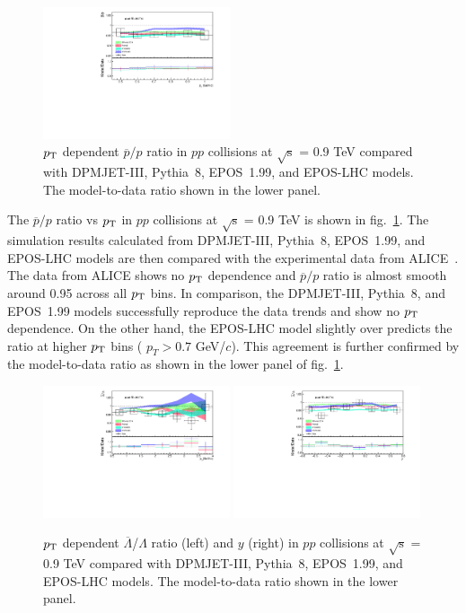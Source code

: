 \documentclass{article}
\newcommand{\sqrts}{\mbox{$\sqrt{\mathrm{s}}$}}
\newcommand{\alam}{$\overline{\Lambda}$}
\newcommand{\lam}{$\Lambda$}
\newcommand{\ppt}{$p_{\rm T}$}
\begin{document}
\begin{figure}[!ht]
\centering
\includegraphics[width=0.49\textwidth,height=0.35\textheight]{pap_pt_0.9.pdf}

\caption{{\ppt} dependent $\overline{p}/p$ ratio in $pp$ collisions at {\sqrts} = 0.9 TeV compared with DPMJET-III, Pythia~8, EPOS~1.99, and EPOS-LHC models. The model-to-data ratio shown in the lower panel. }
\label{fig1}
\end{figure}


 The $\overline{p}/p$ ratio vs {\ppt} in $pp$ collisions at {\sqrts} = 0.9 TeV is shown in fig.~\ref{fig1}. The simulation results calculated from DPMJET-III, Pythia~8, EPOS~1.99, and EPOS-LHC models are then compared with the experimental data from ALICE~\cite{20}. The data from ALICE shows no {\ppt} dependence and $\overline{p}/p$ ratio is almost smooth around 0.95 across all {\ppt} bins. In comparison, the DPMJET-III, Pythia~8, and EPOS~1.99 models successfully reproduce the data trends and show no {\ppt} dependence. On the other hand, the EPOS-LHC model slightly over predicts the ratio at higher {\ppt} bins ( $p_T > 0.7$ GeV/$c$). This agreement is further confirmed by the model-to-data ratio as shown in the lower panel of fig.~\ref{fig1}.


\begin{figure}[!ht]
\centering
\includegraphics[width=0.49\textwidth,height=0.35\textheight]{lalamb_pt_0.9.pdf}
\includegraphics[width=0.49\textwidth,height=0.35\textheight]{lalamb_eta_0.9.pdf}

\caption{{\ppt} dependent {\alam /\lam} ratio (left) and $y$ (right) in $pp$ collisions at {\sqrts} = 0.9 TeV compared with DPMJET-III, Pythia~8, EPOS~1.99, and EPOS-LHC models. The model-to-data ratio shown in the lower panel. }
\label{fig2}
\end{figure}
\end{document}
